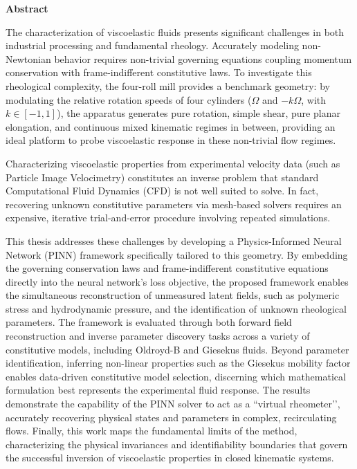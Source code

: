 \begin{center}
    \vspace*{1.2cm}
    {\Large \textbf{Abstract}}
    \vspace{0.8cm}
\end{center}

\noindent

The characterization of viscoelastic fluids presents significant challenges in both industrial processing and fundamental rheology.
Accurately modeling non-Newtonian behavior requires non-trivial governing
equations coupling momentum conservation with frame-indifferent constitutive
laws. To investigate this rheological complexity, the four-roll
mill provides a benchmark geometry: by modulating the relative rotation speeds
of four cylinders ($\Omega$ and $-k\Omega$, with $k \in [-1, 1]$), the apparatus
generates pure rotation, simple shear, pure planar elongation, and continuous
mixed kinematic regimes in between, providing an ideal platform to probe
viscoelastic response in these non-trivial flow regimes.

Characterizing viscoelastic properties from experimental velocity data
(such as Particle Image Velocimetry) constitutes an inverse problem that standard
Computational Fluid Dynamics (CFD) is not well suited to solve. In fact, recovering unknown
constitutive parameters via mesh-based solvers requires an expensive, iterative
trial-and-error procedure involving repeated simulations.

This thesis addresses these challenges by developing a Physics-Informed Neural
Network (PINN) framework specifically tailored to this geometry. %
By embedding the governing conservation laws and frame-indifferent constitutive
equations directly into the neural network's loss objective, the proposed
framework enables the simultaneous reconstruction of unmeasured latent fields,
such as polymeric stress and hydrodynamic pressure, and the identification of
unknown rheological parameters. The framework is evaluated through both forward
field reconstruction and inverse parameter discovery tasks across a variety of
constitutive models, including Oldroyd-B and Giesekus fluids. Beyond parameter
identification, inferring non-linear properties such as the Giesekus mobility
factor enables data-driven constitutive model selection, discerning which
mathematical formulation best represents the experimental fluid response. The
results demonstrate the capability of the PINN solver to act as a ``virtual rheometer’’, accurately recovering physical states and parameters in complex,
recirculating flows. Finally, this work maps the fundamental limits of the
method, characterizing the physical invariances and identifiability boundaries
that govern the successful inversion of viscoelastic properties in closed
kinematic systems.
\clearpage
